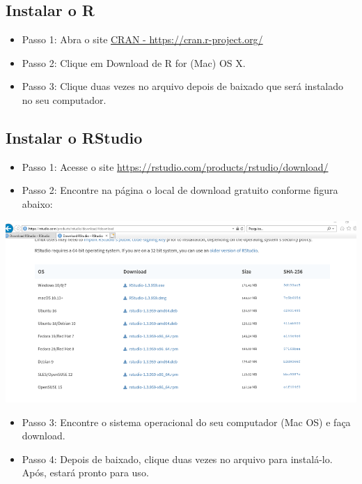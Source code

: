 \documentclass[
  brazil,
]{book}
\providecommand{\tightlist}{%
  \setlength{\itemsep}{0pt}\setlength{\parskip}{0pt}}
\begin{document}
\hypertarget{instalar-o-r-1}{%
\subsection{Instalar o R}\label{instalar-o-r-1}}

\begin{itemize}
\tightlist
\item
  Passo 1: Abra o site \href{https://cran.r-project.org/}{CRAN - https://cran.r-project.org/}
\item
  Passo 2: Clique em Download de R for (Mac) OS X.\\
\item
  Passo 3: Clique duas vezes no arquivo depois de baixado que será instalado no seu computador.
\end{itemize}

\hypertarget{instalar-o-rstudio-1}{%
\subsection{Instalar o RStudio}\label{instalar-o-rstudio-1}}

\begin{itemize}
\tightlist
\item
  Passo 1: Acesse o site \url{https://rstudio.com/products/rstudio/download/}\\
\item
  Passo 2: Encontre na página o local de download gratuito conforme figura abaixo:
\end{itemize}

\includegraphics[width=13.54in]{img/inst_1_rstudio}

\begin{itemize}
\tightlist
\item
  Passo 3: Encontre o sistema operacional do seu computador (Mac OS) e faça download.\\
\item
  Passo 4: Depois de baixado, clique duas vezes no arquivo para instalá-lo. Após, estará pronto para uso.
\end{itemize}
\end{document}
